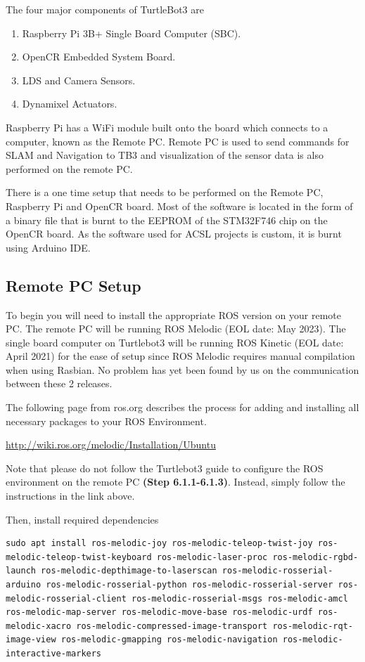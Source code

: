 \documentclass[12]{article}
\begin{document}
The four major components of TurtleBot3 are 
\begin{enumerate}
	\item {Raspberry Pi 3B+ Single Board Computer (SBC).}
	\item {OpenCR Embedded System Board.}
	\item {LDS and Camera Sensors.}
	\item {Dynamixel Actuators.}
\end{enumerate}

Raspberry Pi has a WiFi module built onto the board which connects to a computer, known as the Remote PC. Remote PC is used to send commands for SLAM and Navigation to TB3 and visualization of the sensor data is also performed on the remote PC.

There is a one time setup that needs to be performed on the Remote PC, Raspberry Pi and OpenCR board. Most of the software is located in the form of a binary file that is burnt to the EEPROM of the STM32F746 chip on the OpenCR board. As the software used for ACSL projects is custom, it is burnt using Arduino IDE.
 
\subsection{Remote PC Setup}

To begin you will need to install the appropriate ROS version on your remote PC. The remote PC will be running ROS Melodic (EOL date: May 2023). 
The single board computer on Turtlebot3 will be running ROS Kinetic (EOL date: April 2021) for the ease of setup since ROS Melodic requires manual compilation when using Rasbian. 
No problem has yet been found by us on the communication between these 2 releases. 

The following page from ros.org describes the process for adding and installing all necessary packages to your ROS Environment.

\url{http://wiki.ros.org/melodic/Installation/Ubuntu} 

Note that please do not follow the Turtlebot3 guide to configure the ROS environment on the remote PC \textbf{(Step 6.1.1-6.1.3)}. 
Instead, simply follow the instructions in the link above.

Then, install required dependencies
\begin{lstlisting}[style=bash]
sudo apt install ros-melodic-joy ros-melodic-teleop-twist-joy ros-melodic-teleop-twist-keyboard ros-melodic-laser-proc ros-melodic-rgbd-launch ros-melodic-depthimage-to-laserscan ros-melodic-rosserial-arduino ros-melodic-rosserial-python ros-melodic-rosserial-server ros-melodic-rosserial-client ros-melodic-rosserial-msgs ros-melodic-amcl ros-melodic-map-server ros-melodic-move-base ros-melodic-urdf ros-melodic-xacro ros-melodic-compressed-image-transport ros-melodic-rqt-image-view ros-melodic-gmapping ros-melodic-navigation ros-melodic-interactive-markers
\end{lstlisting}
\end{document}
